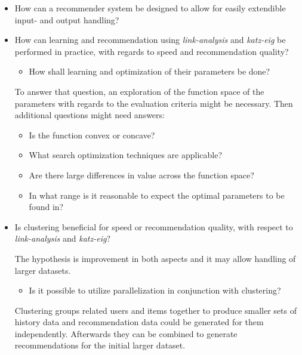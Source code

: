 \documentclass[11pt]{article}
\begin{document}
\begin{itemize}

    \item How can a recommender system be designed to allow for easily extendible input- and output handling?


    \item How can learning and recommendation using \textit{link-analysis} and \textit{katz-eig} be performed in practice, with regards to speed and recommendation quality?

        \begin{itemize}
            \item How shall learning and optimization of their parameters be done?
        \end{itemize}

        To answer that question, an exploration of the function space of the parameters with regards to the evaluation criteria might be necessary. Then additional questions might need answers:

          \begin{itemize}
                \item Is the function convex or concave?
                \item What search optimization techniques are applicable?
                \item Are there large differences in value across the function space?
                \item In what range is it reasonable to expect the optimal parameters to be found in?
          \end{itemize}


    \item Is clustering beneficial for speed or recommendation quality, with respect to \textit{link-analysis} and \textit{katz-eig}?

          The hypothesis is improvement in both aspects and it may allow handling of larger datasets.

          \begin{itemize}
                \item Is it possible to utilize parallelization in conjunction with clustering?
          \end{itemize}

          Clustering groups related users and items together to produce smaller sets of history data and recommendation data could be generated for them independently. Afterwards they can be combined to generate recommendations for the initial larger dataset.

\end{itemize}
\end{document}
